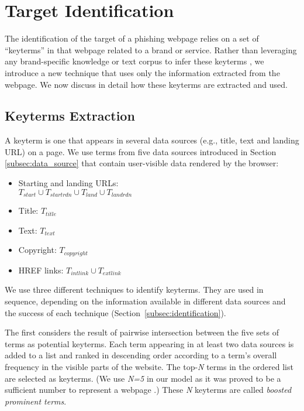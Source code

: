 \documentclass[10pt,conference,compsocconf,letterpaper]{IEEEtran}
\begin{document}
\section{Target Identification}
\label{sec:target}

The identification of the target of a phishing webpage relies on a set of ``keyterms'' in that webpage related to a brand or service. Rather than leveraging any brand-specific knowledge or text corpus to infer these keyterms \cite{ramesh:2014:efficious,liu:2012:anti}, we introduce a new technique that uses only the information extracted from the webpage. We now discuss in detail how these keyterms are extracted and used.

\subsection{Keyterms Extraction}

A keyterm is one that appears in several data sources (e.g., title, text and landing URL) on a page. We use terms from five data sources introduced in Section \ref{subsec:data_source} that contain user-visible data rendered by the browser:

\begin{itemize}
\item Starting and landing URLs: \\ $T_{start} \cup T_{startrdn} \cup T_{land} \cup T_{landrdn}$
\item Title: $T_{title}$
\item Text: $T_{text}$
\item Copyright: $T_{copyright}$
\item HREF links: $T_{intlink} \cup T_{extlink}$
\end{itemize}


We use three different techniques to identify keyterms. They are used in sequence, depending on the information available in different data sources and the success of each technique (Section~\ref{subsec:identification}).


The first considers the result of pairwise intersection between the five sets of terms as potential keyterms. Each term appearing in at least two data sources is added to a list and ranked in descending order according to a term's overall frequency in the visible parts of the website. 
The top-\textit{N} terms in the ordered list are selected as keyterms. (We use \textit{N=5} in our model as it was proved to be a sufficient number to represent a webpage \cite{zhang:2007:cantina}.) 
These \textit{N} keyterms are called \textit{boosted prominent terms}.
\end{document}
